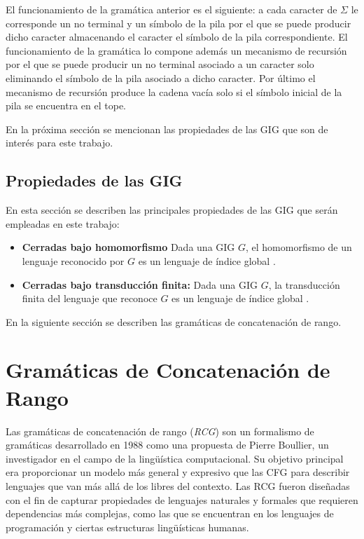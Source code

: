 \documentclass[12pt]{article}
\begin{document}
El funcionamiento de la gramática anterior es el siguiente: a cada caracter de $\Sigma$ le corresponde un no
terminal y un símbolo de la pila por el que se puede producir dicho caracter almacenando el caracter el símbolo
de la pila correspondiente. El funcionamiento de la gramática lo compone además un mecanismo de recursión por el
que se puede producir un no terminal asociado a un caracter solo eliminando el símbolo de la pila asociado a
dicho caracter. Por último el mecanismo de recursión produce la cadena vacía solo si el símbolo inicial de la
pila se encuentra en el tope.

En la próxima sección se mencionan las propiedades de las GIG que son de interés para este trabajo.
\subsection{Propiedades de las GIG}

En esta sección se describen las principales propiedades de las GIG que serán empleadas en este trabajo:
\begin{itemize}
    \item  \textbf{Cerradas bajo homomorfismo} Dada una GIG $G$, el homomorfismo de un lenguaje reconocido por $G$ es un lenguaje de índice global \cite{globalIndexLanguages}.
    \item  \textbf{Cerradas bajo transducción finita:} Dada una GIG $G$, la transducción finita del lenguaje que reconoce $G$ es un lenguaje de índice global \cite{globalIndexLanguages}.
\end{itemize}

En la siguiente sección se describen las gramáticas de concatenación de rango.

\section{Gramáticas de Concatenación de Rango}

Las gramáticas de concatenación de rango (\textit{RCG}) \cite{mainRCGBib} son un formalismo de gramáticas desarrollado
en 1988 como una propuesta de Pierre Boullier, un investigador en el campo de la lingüística
computacional. Su objetivo principal era proporcionar un modelo más general y expresivo que las CFG para describir
lenguajes que van más allá de los libres del contexto. Las RCG fueron diseñadas con el fin de capturar propiedades
de lenguajes naturales y formales que requieren dependencias más complejas, como las que se encuentran en los
lenguajes de programación y ciertas estructuras lingüísticas humanas.
\end{document}
